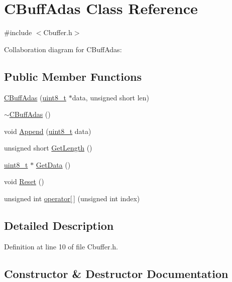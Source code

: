 \hypertarget{class_c_buff_adas}{}\section{C\+Buff\+Adas Class Reference}
\label{class_c_buff_adas}


{\ttfamily \#include $<$Cbuffer.\+h$>$}



Collaboration diagram for C\+Buff\+Adas\+:
\subsection*{Public Member Functions}
\begin{DoxyCompactItemize}
\item 
\mbox{\hyperlink{class_c_buff_adas_afb14758fc413199161d48963a83edadb}{C\+Buff\+Adas}} (\mbox{\hyperlink{_a_d_a_s___types_8h_aba7bc1797add20fe3efdf37ced1182c5}{uint8\+\_\+t}} $\ast$data, unsigned short len)
\item 
\mbox{\hyperlink{class_c_buff_adas_a55af513577ba8522492fff4db85da247}{$\sim$\+C\+Buff\+Adas}} ()
\item 
void \mbox{\hyperlink{class_c_buff_adas_ad131824caddc2ee1b90a629e4c30f215}{Append}} (\mbox{\hyperlink{_a_d_a_s___types_8h_aba7bc1797add20fe3efdf37ced1182c5}{uint8\+\_\+t}} data)
\item 
unsigned short \mbox{\hyperlink{class_c_buff_adas_aa17f6536175e0aafe8ab7b307decf279}{Get\+Length}} ()
\item 
\mbox{\hyperlink{_a_d_a_s___types_8h_aba7bc1797add20fe3efdf37ced1182c5}{uint8\+\_\+t}} $\ast$ \mbox{\hyperlink{class_c_buff_adas_a56fdcdc9766874d3a6fef04119ee91f9}{Get\+Data}} ()
\item 
void \mbox{\hyperlink{class_c_buff_adas_a2ff1ee5f1dfa56117d76b17027d7b7e8}{Reset}} ()
\item 
unsigned int \mbox{\hyperlink{class_c_buff_adas_aedceb4a4bcc47b6e4150a821f0494862}{operator\mbox{[}$\,$\mbox{]}}} (unsigned int index)
\end{DoxyCompactItemize}


\subsection{Detailed Description}


Definition at line 10 of file Cbuffer.\+h.



\subsection{Constructor \& Destructor Documentation}
\mbox{\label{class_c_buff_adas_afb14758fc413199161d48963a83edadb}} 
